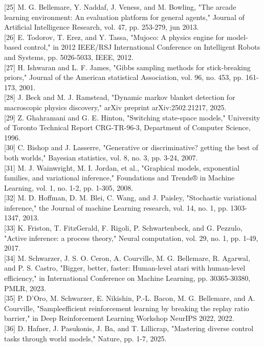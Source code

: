 \documentclass[10pt]{article}
\begin{document}
[25] M. G. Bellemare, Y. Naddaf, J. Veness, and M. Bowling, "The arcade learning environment: An evaluation platform for general agents," Journal of Artificial Intelligence Research, vol. 47, pp. 253-279, jun 2013.\\[0pt]
[26] E. Todorov, T. Erez, and Y. Tassa, "Mujoco: A physics engine for model-based control," in 2012 IEEE/RSJ International Conference on Intelligent Robots and Systems, pp. 5026-5033, IEEE, 2012.\\[0pt]
[27] H. Ishwaran and L. F. James, "Gibbs sampling methods for stick-breaking priors," Journal of the American statistical Association, vol. 96, no. 453, pp. 161-173, 2001.\\[0pt]
[28] J. Beck and M. J. Ramstead, "Dynamic markov blanket detection for macroscopic physics discovery," arXiv preprint arXiv:2502.21217, 2025.\\[0pt]
[29] Z. Ghahramani and G. E. Hinton, "Switching state-space models," University of Toronto Technical Report CRG-TR-96-3, Department of Computer Science, 1996.\\[0pt]
[30] C. Bishop and J. Lasserre, "Generative or discriminative? getting the best of both worlds," Bayesian statistics, vol. 8, no. 3, pp. 3-24, 2007.\\[0pt]
[31] M. J. Wainwright, M. I. Jordan, et al., "Graphical models, exponential families, and variational inference," Foundations and Trends® in Machine Learning, vol. 1, no. 1-2, pp. 1-305, 2008.\\[0pt]
[32] M. D. Hoffman, D. M. Blei, C. Wang, and J. Paisley, "Stochastic variational inference," the Journal of machine Learning research, vol. 14, no. 1, pp. 1303-1347, 2013.\\[0pt]
[33] K. Friston, T. FitzGerald, F. Rigoli, P. Schwartenbeck, and G. Pezzulo, "Active inference: a process theory," Neural computation, vol. 29, no. 1, pp. 1-49, 2017.\\[0pt]
[34] M. Schwarzer, J. S. O. Ceron, A. Courville, M. G. Bellemare, R. Agarwal, and P. S. Castro, "Bigger, better, faster: Human-level atari with human-level efficiency," in International Conference on Machine Learning, pp. 30365-30380, PMLR, 2023.\\[0pt]
[35] P. D'Oro, M. Schwarzer, E. Nikishin, P.-L. Bacon, M. G. Bellemare, and A. Courville, "Sampleefficient reinforcement learning by breaking the replay ratio barrier," in Deep Reinforcement Learning Workshop NeurIPS 2022, 2022.\\[0pt]
[36] D. Hafner, J. Pasukonis, J. Ba, and T. Lillicrap, "Mastering diverse control tasks through world models," Nature, pp. 1-7, 2025.\\[0pt]
\end{document}
